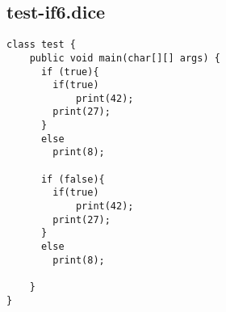 \subsection{test-if6.dice}
\begin{verbatim}
class test {
	public void main(char[][] args) {
	  if (true){
	  	if(true) 
	  		print(42); 
	  	print(27); 
	  }
	  else 
	  	print(8);

	  if (false){
	  	if(true) 
	  		print(42); 
	  	print(27);
	  }
	  else 
	  	print(8);

	}
}

\end{verbatim}